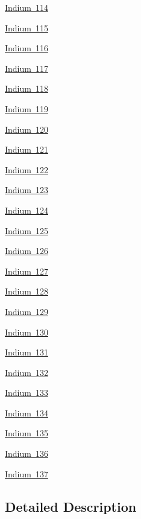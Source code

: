 \begin{DoxyCompactItemize}
\mbox{\hyperlink{group___isotope_const-_indium-_in114}{Indium 114}}
\item 
\mbox{\hyperlink{group___isotope_const-_indium-_in115}{Indium 115}}
\item 
\mbox{\hyperlink{group___isotope_const-_indium-_in116}{Indium 116}}
\item 
\mbox{\hyperlink{group___isotope_const-_indium-_in117}{Indium 117}}
\item 
\mbox{\hyperlink{group___isotope_const-_indium-_in118}{Indium 118}}
\item 
\mbox{\hyperlink{group___isotope_const-_indium-_in119}{Indium 119}}
\item 
\mbox{\hyperlink{group___isotope_const-_indium-_in120}{Indium 120}}
\item 
\mbox{\hyperlink{group___isotope_const-_indium-_in121}{Indium 121}}
\item 
\mbox{\hyperlink{group___isotope_const-_indium-_in122}{Indium 122}}
\item 
\mbox{\hyperlink{group___isotope_const-_indium-_in123}{Indium 123}}
\item 
\mbox{\hyperlink{group___isotope_const-_indium-_in124}{Indium 124}}
\item 
\mbox{\hyperlink{group___isotope_const-_indium-_in125}{Indium 125}}
\item 
\mbox{\hyperlink{group___isotope_const-_indium-_in126}{Indium 126}}
\item 
\mbox{\hyperlink{group___isotope_const-_indium-_in127}{Indium 127}}
\item 
\mbox{\hyperlink{group___isotope_const-_indium-_in128}{Indium 128}}
\item 
\mbox{\hyperlink{group___isotope_const-_indium-_in129}{Indium 129}}
\item 
\mbox{\hyperlink{group___isotope_const-_indium-_in130}{Indium 130}}
\item 
\mbox{\hyperlink{group___isotope_const-_indium-_in131}{Indium 131}}
\item 
\mbox{\hyperlink{group___isotope_const-_indium-_in132}{Indium 132}}
\item 
\mbox{\hyperlink{group___isotope_const-_indium-_in133}{Indium 133}}
\item 
\mbox{\hyperlink{group___isotope_const-_indium-_in134}{Indium 134}}
\item 
\mbox{\hyperlink{group___isotope_const-_indium-_in135}{Indium 135}}
\item 
\mbox{\hyperlink{group___isotope_const-_indium-_in136}{Indium 136}}
\item 
\mbox{\hyperlink{group___isotope_const-_indium-_in137}{Indium 137}}
\end{DoxyCompactItemize}


\subsection{Detailed Description}
